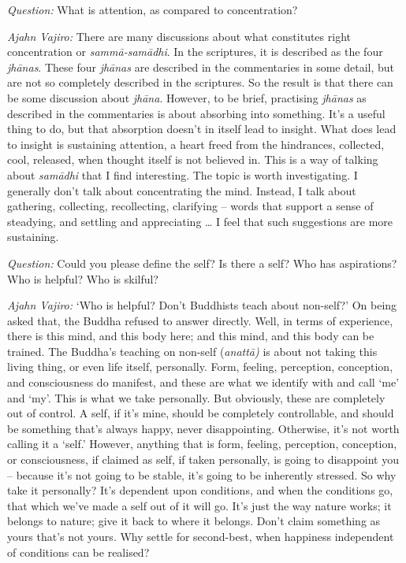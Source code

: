 \clearpage

\enlargethispage{2\baselineskip}

\emph{Question:} What is attention, as compared to concentration?

\emph{Ajahn Vajiro:} There are many discussions about what constitutes right
concentration or \emph{sammā-samādhi}. In the scriptures, it is described as the
four \emph{jhānas}. These four \emph{jhānas} are described in the commentaries
in some detail, but are not so completely described in the scriptures. So the
result is that there can be some discussion about \emph{jhāna}. However, to be
brief, practising \emph{jhānas} as described in the commentaries is about
absorbing into something. It's a useful thing to do, but that absorption doesn't
in itself lead to insight. What does lead to insight is sustaining attention, a
heart freed from the hindrances, collected, cool, released, when thought itself
is not believed in. This is a way of talking about \emph{samādhi} that I find
interesting. The topic is worth investigating. I generally don't talk about
concentrating the mind. Instead, I talk about gathering, collecting,
recollecting, clarifying -- words that support a sense of steadying, and
settling and appreciating \ldots{} I feel that such suggestions are more
sustaining.

\bigskip

\emph{Question:} Could you please define the self? Is there a self? Who has
aspirations? Who is helpful? Who is skilful?

\emph{Ajahn Vajiro:} `Who is helpful? Don't Buddhists teach about non-self?' On being
asked that, the Buddha refused to answer directly. Well, in terms of experience,
there is this mind, and this body here; and this mind, and this body can be
trained. The Buddha's teaching on non-self (\emph{anattā)} is about not taking
this living thing, or even life itself, personally. Form, feeling, perception,
conception, and consciousness do manifest, and these are what we identify with
and call `me' and `my'. This is what we take personally. But obviously, these
are completely out of control. A self, if it's mine, should be completely
controllable, and should be something that's always happy, never disappointing.
Otherwise, it's not worth calling it a `self.' However, anything that is form,
feeling, perception, conception, or consciousness, if claimed as self, if taken
personally, is going to disappoint you -- because it's not going to be stable,
it's going to be inherently stressed. So why take it personally? It's dependent
upon conditions, and when the conditions go, that which we've made a self out of
it will go. It's just the way nature works; it belongs to nature; give it back
to where it belongs. Don't claim something as yours that's not yours. Why settle
for second-best, when happiness independent of conditions can be realised?


